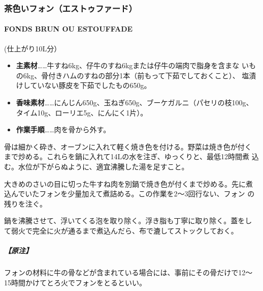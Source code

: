 \begin{recette}
\hypertarget{ux8336ux8272ux3044ux30d5ux30a9ux30f3ux30a8ux30b9ux30c8ux30a5ux30d5ux30a1ux30fcux30c9}{%
\subsubsection{茶色いフォン（エストゥファード）}\label{ux8336ux8272ux3044ux30d5ux30a9ux30f3ux30a8ux30b9ux30c8ux30a5ux30d5ux30a1ux30fcux30c9}}

\hypertarget{fonds-brun}{%
\paragraph{FONDS BRUN OU ESTOUFFADE}\label{fonds-brun}}


(仕上がり10L分）

\begin{itemize}
\item
  \textbf{主素材}\ldots{}\ldots{}牛すね6kg、仔牛のすね6kgまたは仔牛の端肉で脂身を含まな
  いもの6kg、骨付きハムのすねの部分1本（前もって下茹でしておくこと）、
  塩漬けしていない豚皮を下茹でしたもの650g。
\item
  \textbf{香味素材}\ldots{}\ldots{}にんじん650g、玉ねぎ650g、ブーケガルニ（パセリの枝100g、
  タイム10g、ローリエ5g、にんにく1片）。
\item
  \textbf{作業手順}\ldots{}\ldots{}肉を骨から外す。
\end{itemize}

骨は細かく砕き、オーブンに入れて軽く焼き色を付ける。野菜は焼き色が付く
まで炒める。これらを鍋に入れて14Lの水を注ぎ、ゆっくりと、最低12時間煮
込む。水位が下がらぬように、適宜沸騰した湯を足すこと。

大きめのさいの目に切った牛すね肉を別鍋で焼き色が付くまで炒める。先に煮
込んでいたフォンを少量加えて煮詰める。この作業を2〜3回行ない、フォン
の残りを注ぐ。

鍋を沸騰させて、浮いてくる泡を取り除く。浮き脂も丁寧に取り除く。蓋をし
て弱火で完全に火が通るまで煮込んだら、布で漉してストックしておく。

\hypertarget{ux539fux6ce8}{%
\subparagraph{【原注】}\label{ux539fux6ce8}}

フォンの材料に牛の骨などが含まれている場合には、事前にその骨だけで12〜
15時間かけてとろ火でフォンをとるといい。


\end{recette}
